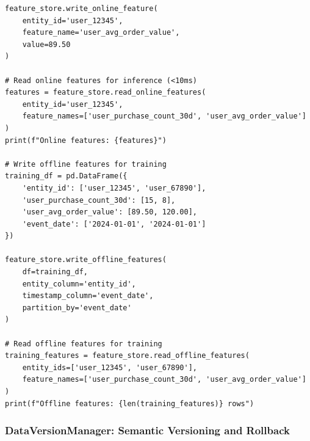 \begin{lstlisting}[style=python, caption=FeatureStoreIntegrator with Dual Serving Modes]
feature_store.write_online_feature(
    entity_id='user_12345',
    feature_name='user_avg_order_value',
    value=89.50
)

# Read online features for inference (<10ms)
features = feature_store.read_online_features(
    entity_id='user_12345',
    feature_names=['user_purchase_count_30d', 'user_avg_order_value']
)
print(f"Online features: {features}")

# Write offline features for training
training_df = pd.DataFrame({
    'entity_id': ['user_12345', 'user_67890'],
    'user_purchase_count_30d': [15, 8],
    'user_avg_order_value': [89.50, 120.00],
    'event_date': ['2024-01-01', '2024-01-01']
})

feature_store.write_offline_features(
    df=training_df,
    entity_column='entity_id',
    timestamp_column='event_date',
    partition_by='event_date'
)

# Read offline features for training
training_features = feature_store.read_offline_features(
    entity_ids=['user_12345', 'user_67890'],
    feature_names=['user_purchase_count_30d', 'user_avg_order_value']
)
print(f"Offline features: {len(training_features)} rows")
\end{lstlisting}

\subsubsection{DataVersionManager: Semantic Versioning and Rollback}

